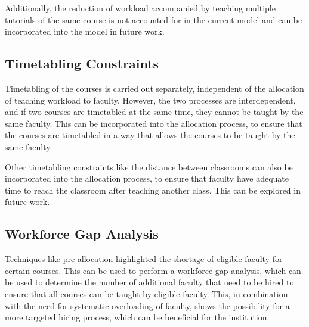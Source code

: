 Additionally, the reduction of workload accompanied by teaching multiple tutorials of the same course is not accounted for in the current model and can be incorporated into the model in future work.

\subsection{Timetabling Constraints}

Timetabling of the courses is carried out separately, independent of the allocation of teaching workload to faculty. However, the two processes are interdependent, and if two courses are timetabled at the same time, they cannot be taught by the same faculty. This can be incorporated into the allocation process, to ensure that the courses are timetabled in a way that allows the courses to be taught by the same faculty.

Other timetabling constraints like the distance between classrooms can also be incorporated into the allocation process, to ensure that faculty have adequate time to reach the classroom after teaching another class. This can be explored in future work.

\subsection{Workforce Gap Analysis}

Techniques like pre-allocation highlighted the shortage of eligible faculty for certain courses. This can be used to perform a workforce gap analysis, which can be used to determine the number of additional faculty that need to be hired to ensure that all courses can be taught by eligible faculty. This, in combination with the need for systematic overloading of faculty, shows the possibility for a more targeted hiring process, which can be beneficial for the institution.
